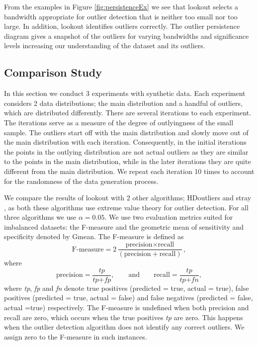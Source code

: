 \documentclass[11pt,a4paper,]{article}
\theoremstyle{definition}
\theoremstyle{definition}
\theoremstyle{definition}
\theoremstyle{remark}
\begin{document}
From the examples in Figure \ref{fig:persistenceEx} we see that lookout selects a bandwidth appropriate for outlier detection that is neither too small nor too large. In addition, lookout identifies outliers correctly. The outlier persistence diagram gives a snapshot of the outliers for varying bandwidths and significance levels increasing our understanding of the dataset and its outliers.

\hypertarget{sec:SyntheticComparison}{%
\subsection{Comparison Study}\label{sec:SyntheticComparison}}

In this section we conduct 3 experiments with synthetic data. Each experiment considers 2 data distributions; the main distribution and a handful of outliers, which are distributed differently. There are several iterations to each experiment. The iterations serve as a measure of the degree of outlyingness of the small sample. The outliers start off with the main distribution and slowly move out of the main distribution with each iteration. Consequently, in the initial iterations the points in the outlying distribution are not actual outliers as they are similar to the points in the main distribution, while in the later iterations they are quite different from the main distribution. We repeat each iteration 10 times to account for the randomness of the data generation process.

We compare the results of lookout with 2 other algorithms; HDoutliers \autocite{wilkinson2017visualizing} and stray \autocite{stray}, as both these algorithms use extreme value theory for outlier detection. For all three algorithms we use \(\alpha = 0.05\). We use two evaluation metrics suited for imbalanced datasets: the F-measure and the geometric mean of sensitivity and specificity denoted by Gmean. The F-measure is defined as
\begin{equation}\label{eq:fmeasure}
    \text{F-measure} = 2\frac{\text{precision} \times \text{recall}}{\left( \text{precision} + \text{recall} \right) }  ,
\end{equation}
where
\begin{equation}\label{eq:pr}
    \text{precision} = \frac{ \textit{tp} }{\textit{tp} + \textit{fp}}  , \qquad \text{and} \qquad \text{recall} = \frac{\textit{tp}}{\textit{tp} + \textit{fn}}  ,
\end{equation}
where \emph{tp}, \emph{fp} and \emph{fn} denote true positives (predicted = true, actual = true), false positives (predicted = true, actual = false) and false negatives (predicted = false, actual =true) respectively. The F-measure is undefined when both precision and recall are zero, which occurs when the true positives \emph{tp} are zero. This happens when the outlier detection algorithm does not identify any correct outliers. We assign zero to the F-measure in such instances.
\end{document}
